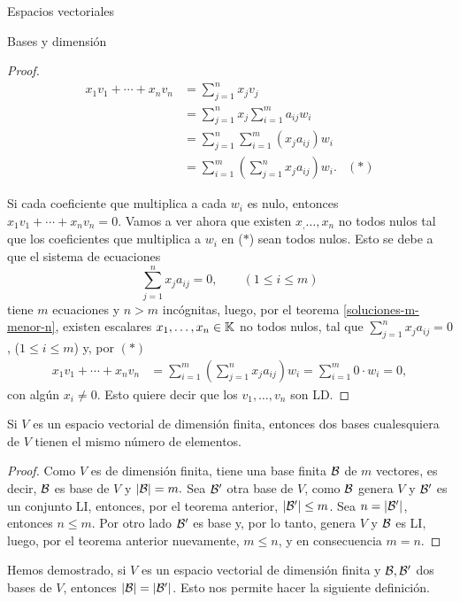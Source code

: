 \begin{chapter}{Espacios vectoriales}
\begin{section}{Bases y dimensi\'on}
\begin{proof}
    \begin{align*}
        x_1v_1 + \cdots+x_nv_n &= \sum_{j=1}^{n} x_jv_j& \\
        & = \sum_{j=1}^{n}x_j \sum_{i=1}^{m}a_{ij}w_i& \\
        & = \sum_{j=1}^{n} \sum_{i=1}^{m}(x_ja_{ij})w_i& \\ 
        & = \sum_{i=1}^{m}(\sum_{j=1}^{n} x_ja_{ij})w_i.&  (*)
    \end{align*}
    
    Si cada coeficiente que multiplica a cada $w_i$ es nulo, entonces $  x_1v_1 + \cdots+x_nv_n=0$. Vamos a ver ahora que existen $x_,\ldots,x_n$ no todos nulos tal que los coeficientes que multiplica a $w_i$  en ($*$) sean todos nulos. Esto se debe a que el sistema de ecuaciones
    \begin{equation*}
        \sum_{j=1}^{n} x_ja_{ij} = 0, \qquad (1 \le i \le m) 
    \end{equation*}
    tiene $m$ ecuaciones  y $n > m$ incógnitas, luego, por el teorema \ref{soluciones-m-menor-n}, existen escalares $x_1,\ldots,x_n \in \mathbb K$ no todos nulos, tal que $\sum_{j=1}^{n} x_ja_{ij} = 0$, ($1 \le i \le m$) y, por $(*)$
    \begin{align*}
        x_1v_1 + \cdots+x_nv_n &=  \sum_{i=1}^{m}(\sum_{j=1}^{n} x_ja_{ij})w_i = \sum_{i=1}^{m}0\cdot w_i =0,
    \end{align*}
    con algún $x_i \ne 0$. Esto quiere decir que los $v_1,\ldots,v_n$ son LD.
\end{proof}


\begin{corolario}
    Si $V$ es un espacio vectorial de dimensión finita, entonces dos bases cualesquiera de $V$ tienen el mismo número de elementos.
\end{corolario}
\begin{proof}
        Como $V$ es de dimensión finita, tiene una base finita $\mathcal{B}$  de $m$ vectores, es decir,  $\mathcal{B}$ es base de $V$ y  $|\mathcal{B}| = m.$
        Sea $\mathcal{B}'$  otra base de $V$, como $\mathcal{B}$  genera $V$ y  $\mathcal{B}'$ es  un conjunto LI, entonces, por el teorema anterior, $|\mathcal{B}'| \le m$. Sea $n = |\mathcal{B}'|$,  entonces $n \le m$. Por otro lado $\mathcal{B}'$ es base y, por lo tanto,  genera $V$ y  $\mathcal{B}$ es LI, luego, por el teorema anterior nuevamente,  $m \le n$, y en consecuencia $m=n$.
\end{proof}

Hemos demostrado, si $V$  es un espacio vectorial de dimensión finita y $\mathcal{B},\mathcal{B}' $ dos bases de $V$,  entonces $|\mathcal{B}|=|\mathcal{B}'|$. Esto nos permite hacer la siguiente definición. 



\end{section}
\end{chapter}
